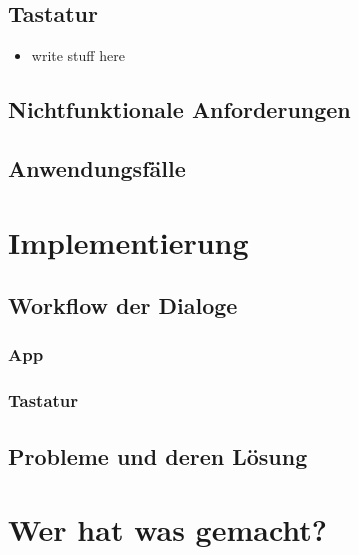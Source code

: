 \documentclass[11pt]{article}
\begin{document}
		\subsection{Tastatur}
		\begin{itemize}
			\item write stuff here
		\end{itemize}
	
	\subsection{Nichtfunktionale Anforderungen}
	\subsection{Anwendungsfälle}


\section{Implementierung}
	\subsection{Workflow der Dialoge}
		\subsubsection{App}
		\subsubsection{Tastatur}

	\subsection{Probleme und deren Lösung}

\section{Wer hat was gemacht?}

\end{document}
